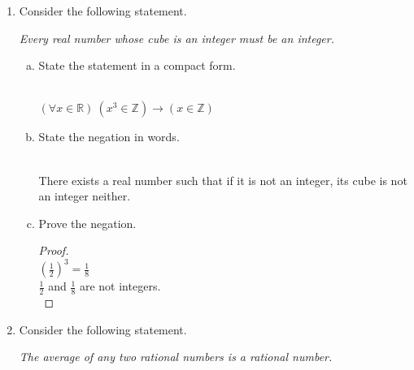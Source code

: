 \documentclass[12pt]{amsart}
\begin{document}
\begin{enumerate}[{\bfseries 1.}]
\vspace{0.2in}
\item Consider the following statement.

	\vspace{0.1in}
	\begin{center}
	\noindent
	\textit{\footnotemark[2] Every real number whose cube is an integer must be an integer.}
	\end{center}

	\begin{enumerate}[(a)]
	\vspace{0.1in}
	\item State the statement in a compact form.
	\begin{normalize}
	    \vspace{0.1in}
        \\$(\forall x\in\mathbb{R})\ (x^3\in\mathbb{Z})\to (x\in\mathbb{Z})$
        \\
    \end{normalize}
	\item State the negation in words.
	\begin{normalize}
	    \vspace{0.1in}
        \\There exists a real number such that if it is not an integer, its cube is not an integer neither. 
        \\
    \end{normalize}
	\item Prove the negation.
	\begin{normalize}
	\begin{proof}
	    \vspace{0.1in}
        \\$(\frac{1}{2}) ^3 = \frac{1}{8}$ 
        \\$\frac{1}{2}$ and $\frac{1}{8}$ are not integers.
        \\
        \end{proof}
    \end{normalize}
	\end{enumerate}

\newpage
\item Consider the following statement.

	\vspace{0.1in}
	\begin{center}
	\noindent
	\textit{The average of any two rational numbers is a rational number.}
	\end{center}


\end{enumerate}
\end{document}
